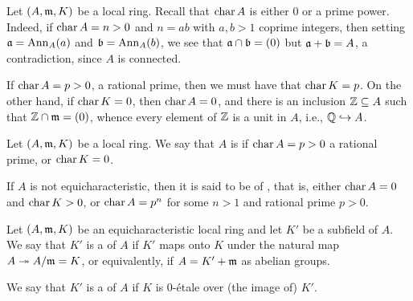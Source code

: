 \begin{mdframed}
Let $(A,\mathfrak{m}, K)$ be a local ring. Recall that $\operatorname{char} A$ is either $0$ or a prime power. Indeed, if $\operatorname{char} A = n > 0$ and $n = ab$ with $a, b > 1$ coprime integers, then setting $\mathfrak{a} = \operatorname{Ann}_A(a)$ and $\mathfrak{b} = \operatorname{Ann}_A(b)$, we see that $\mathfrak{a}\cap\mathfrak{b} = (0)$ but $\mathfrak{a} + \mathfrak{b} = A$, a contradiction, since $A$ is connected. 

If $\operatorname{char} A = p > 0$, a rational prime, then we must have that $\operatorname{char} K = p$. On the other hand, if $\operatorname{char} K = 0$, then $\operatorname{char} A = 0$, and there is an inclusion $\mathbb{Z}\subseteq A$ such that $\mathbb{Z}\cap\mathfrak{m} = (0)$, whence every element of $\mathbb{Z}$ is a unit in $A$, i.e., $\mathbb{Q}\hookrightarrow A$.
\end{mdframed}

\begin{definition}
    Let $(A,\mathfrak{m},K)$ be a local ring. We say that $A$ is  if $\operatorname{char} A = p > 0$ a rational prime, or $\operatorname{char} K = 0$.

    If $A$ is not equicharacteristic, then it is said to be of , that is, either $\operatorname{char} A = 0$ and $\operatorname{char} K > 0$, or $\operatorname{char} A = p^n$ for some $n > 1$ and rational prime $p > 0$.
\end{definition}

\begin{definition}
    Let $(A,\mathfrak{m}, K)$ be an equicharacteristic local ring and let $K'$ be a subfield of $A$. We say that $K'$ is a  of $A$ if $K'$ maps onto $K$ under the natural map $A\twoheadrightarrow A/\mathfrak{m} = K$, or equivalently, if $A = K' + \mathfrak{m}$ as abelian groups. 

    We say that $K'$ is a  of $A$ if $K$ is $0$-\'etale over (the image of) $K'$.
\end{definition}


